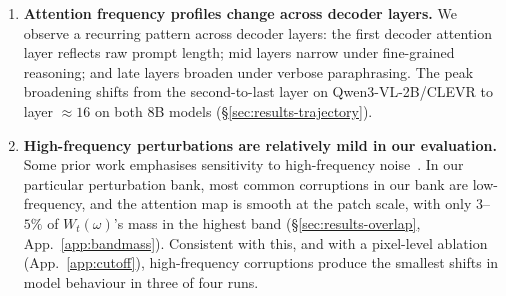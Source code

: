\documentclass[10pt,twocolumn,letterpaper]{article}
\newcommand{\Wt}{W_t(\omega)}
\begin{document}
\begin{enumerate}[leftmargin=*,itemsep=1pt,topsep=2pt,parsep=0pt]
    \item \textbf{Attention frequency profiles change across decoder layers.} We observe a recurring pattern across decoder layers: %
    the first decoder attention layer reflects raw prompt length; mid layers narrow under fine-grained reasoning; and late layers broaden under verbose paraphrasing. The peak broadening shifts from the second-to-last layer on Qwen3-VL-2B/CLEVR to layer $\approx 16$ on both 8B models (\S\ref{sec:results-trajectory}).
    
    \item \textbf{High-frequency perturbations are relatively mild in our evaluation.} Some prior work emphasises sensitivity to high-frequency noise~\citep{yin2019fourier}. In our particular perturbation bank, most common corruptions in our bank are low-frequency, and the attention map is smooth at the patch scale, with only $3$--$5\%$ of $\Wt$'s mass in the highest band (\S\ref{sec:results-overlap}, App.~\ref{app:bandmass}). Consistent with this, and with a pixel-level ablation (App.~\ref{app:cutoff}), high-frequency corruptions produce the smallest shifts in model behaviour in three of four runs.
\end{enumerate}
\end{document}
